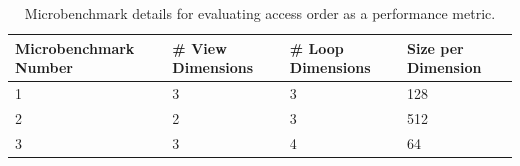 \documentclass[sigconf,review=true]{acmart}
\begin{document}
\begin{table}
	\centering
	\begin{tabular}{|p{2.2cm}|p{1.6cm}|p{1.6cm}|p{1.5cm}|}
		\hline
		\raggedright Microbenchmark \linebreak Number & \raggedright \# View \linebreak Dimensions & \raggedright \# Loop \linebreak Dimensions & \raggedright Size per \linebreak Dimension \tabularnewline
		\hline
		1 & 3 & 3 & 128 \\
		2 & 2 & 3 & 512 \\
		3 & 3 & 4 & 64 \\
		\hline
	\end{tabular}
	\caption{Microbenchmark details for evaluating access order as a performance metric.}
	\label{MicrobenchmarkDetails}
\end{table}
\end{document}
